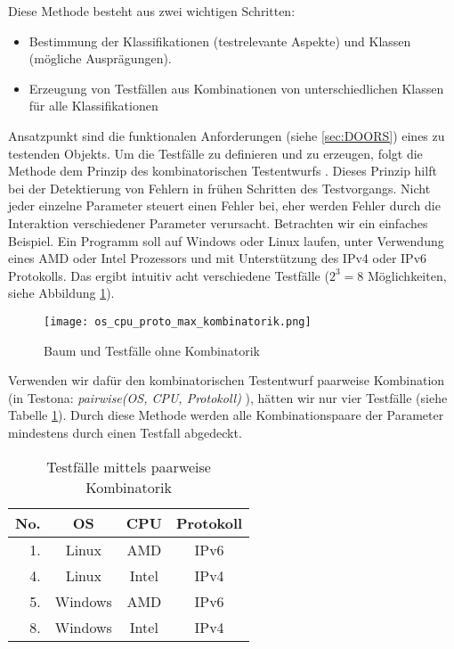  Diese Methode besteht aus zwei wichtigen Schritten:
\begin{itemize}
\item Bestimmung der Klassifikationen (testrelevante Aspekte) und Klassen (mögliche Ausprägungen).
\item Erzeugung von Testfällen aus Kombinationen von unterschiedlichen Klassen für alle Klassifikationen
\end{itemize}

Ansatzpunkt sind die funktionalen Anforderungen (siehe \ref{sec:DOORS}) eines zu testenden Objekts. Um die Testfälle zu definieren und zu erzeugen, folgt die Methode dem Prinzip des kombinatorischen Testentwurfs \cite{KlassifikationsbaumMethode}. Dieses Prinzip hilft bei der Detektierung von Fehlern in frühen Schritten des Testvorgangs. Nicht jeder einzelne Parameter steuert einen Fehler bei, eher werden Fehler durch die Interaktion verschiedener Parameter verursacht. Betrachten wir ein einfaches Beispiel. Ein Programm soll auf Windows oder Linux laufen, unter Verwendung eines AMD oder Intel Prozessors und mit Unterstützung des IPv4 oder IPv6 Protokolls. Das ergibt intuitiv acht verschiedene Testfälle ($2^{3} = 8$ Möglichkeiten, siehe Abbildung \ref{ttn.no_kombi}).\\

\begin{figure}[h]
  \begin{center}
    \texttt{[image: os\_cpu\_proto\_max\_kombinatorik.png]}
  		  \caption{Baum und Testfälle ohne Kombinatorik}
     \label{ttn.no_kombi}
  \end{center}
\end{figure}


Verwenden wir dafür den kombinatorischen Testentwurf \glqq paarweise Kombination\grqq~ (in Testona: \textit{pairwise(OS, CPU, Protokoll)} ), hätten wir nur vier Testfälle (siehe Tabelle \ref{table:4TestCases}). Durch diese Methode werden alle Kombinationspaare der Parameter mindestens durch einen Testfall abgedeckt\cite{CombinatorialSoftTesting}.\\

\begin{table}[h]


\begin{center}
	\begin{tabular}{|r||c|c|c|}
	 \hline
	 No. &OS &CPU &Protokoll\\
	 \hline \hline
	 1. &Linux &AMD &IPv6\\
	 \hline
	 4. &Linux &Intel &IPv4\\
	 \hline
	 5. &Windows &AMD &IPv6\\
	 \hline
	 8. &Windows &Intel &IPv4\\
	 \hline
	\end{tabular}
	
	\caption{Testfälle mittels paarweise Kombinatorik}
	\label{table:4TestCases}
\end{center}

\end{table}


